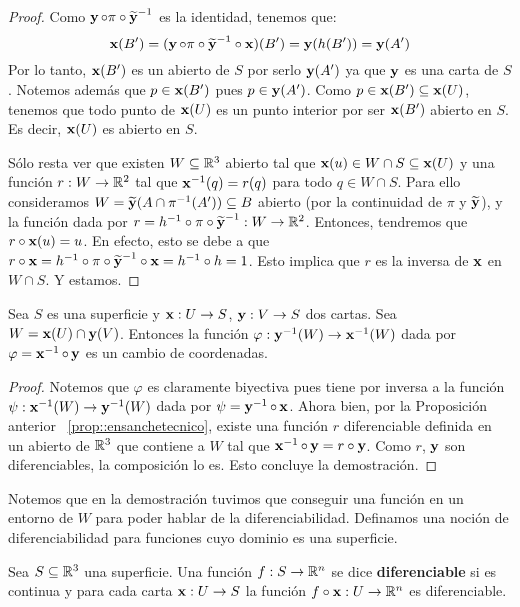 \begin{prop}
\begin{proof}
Como $\y\circ\pi\circ\widetilde{\y}^{-1}$ es la identidad, tenemos que: $$\x(B')=(\y\circ\pi\circ\widetilde{\y}^{-1}\circ\x)(B')=\y(h(B'))=\y(A')$$ Por lo tanto, $\x(B')$ es un abierto de $S$ por serlo $\y(A')$ ya que $\y$ es una carta de $S$. Notemos además que $p\in\x(B')$ pues $p\in\y(A')$. Como $p\in\x(B')\subseteq\x(U)$, tenemos que todo punto de $\x(U)$ es un punto interior por ser $\x(B')$ abierto en $S$. Es decir, $\x(U)$ es abierto en $S$.

Sólo resta ver que existen $W\subseteq\RR^3$ abierto tal que $\x(u)\in W\cap S\subseteq \x(U)$ y una función $r:W\to\RR^2$ tal que $\x^{-1}(q)=r(q)$ para todo $q\in W\cap S$. Para ello consideramos $W = \widetilde{\y}(A\cap\pi^{-1}(A')) \subseteq B$ abierto (por la continuidad de $\pi$ y $\widetilde{\y}$), y la función dada por $r=h^{-1}\circ\pi\circ\widetilde{\y}^{-1}:W\to\RR^2$. Entonces, tendremos que $r\circ \x(u)=u$. En efecto, esto se debe a que $r\circ\x = h^{-1}\circ\pi\circ\widetilde{\y}^{-1}\circ\x = h^{-1}\circ h = 1$. Esto implica que $r$ es la inversa de $\x$ en $W\cap S$. Y estamos.
\end{proof}
\end{prop}

\begin{prop}
Sea $S$ es una superficie y $\x:U\to S$, $\y:V\to S$ dos cartas. Sea $W=\x(U)\cap\y(V)$. Entonces la función $\varphi:\y^{-1}(W)\to\x^{-1}(W)$ dada por $\varphi=\x^{-1}\circ\y$ es un cambio de coordenadas.
\begin{proof}
Notemos que $\varphi$ es claramente biyectiva pues tiene por inversa a la función $\psi:\x^{-1}(W)\to\y^{-1}(W)$ dada por $\psi=\y^{-1}\circ\x$. Ahora bien, por la Proposición anterior ~\ref{prop::ensanchetecnico}, existe una función $r$ diferenciable definida en un abierto de $\RR^3$ que contiene a $W$ tal que $\x^{-1}\circ\y = r\circ\y$. Como $r$, $\y$ son diferenciables, la composición lo es. Esto concluye la demostración.
\end{proof}
\end{prop}

Notemos que en la demostración tuvimos que conseguir una función en un entorno de $W$ para poder hablar de la diferenciabilidad. Definamos una noción de diferenciabilidad para funciones cuyo dominio es una superficie.

\begin{defn}
Sea $S\subseteq\RR^3$ una superficie. Una función $f:S\to\RR^n$ se dice \textbf{diferenciable} si es continua y para cada carta $\x:U\to S$ la función $f\circ\x:U\to\RR^n$ es diferenciable.
\end{defn}

